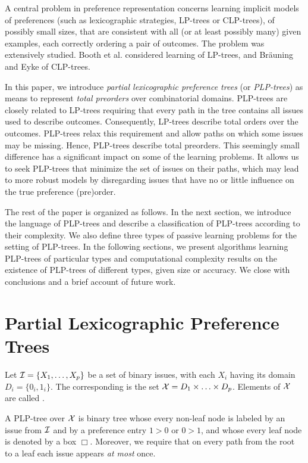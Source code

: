 A central problem in preference representation concerns learning 
implicit models of preferences (such as lexicographic strategies,
LP-trees or CLP-trees), of possibly small sizes, that are consistent 
with all (or at least possibly many) given examples, each correctly 
ordering a pair of outcomes. The problem was extensively studied. Booth
et al.  considered learning of LP-trees, and 
Br\"auning and Eyke  of CLP-trees. 

In this paper, we introduce \emph{partial lexicographic preference trees} (or 
\emph{PLP-trees}) as means to represent \emph{total preorders} over 
combinatorial domains. PLP-trees are closely related to LP-trees
requiring that every path in the tree contains all issues 
used to describe outcomes. Consequently, LP-trees describe total 
orders over the outcomes. PLP-trees relax this requirement and allow 
paths on which some issues may be missing. Hence, 
PLP-trees describe total preorders. This seemingly small difference
has a significant impact on some of the learning problems. It allows
us to seek PLP-trees that minimize the set of issues on their paths,
which may lead to more robust models by disregarding issues 
that have no or little influence on the true preference (pre)order.

The rest of the paper is organized as follows. In the next section, 
we introduce the language of PLP-trees and describe a classification 
of PLP-trees according to their complexity. We also define three types of passive 
learning problems for the setting of PLP-trees. In the following 
sections, we present algorithms learning PLP-trees of particular
types and computational complexity results on the existence of 
PLP-trees of different types, given size or accuracy. We close 
with conclusions and a brief account of future work.


\section{Partial Lexicographic Preference Trees}
Let $\mathcal{I}=\{X_1,\ldots,X_p\}$ be a set of binary issues, with each
$X_i$ having its domain $D_i=\{0_i, 1_i\}$. The corresponding 
 is the set $\mathcal{X}=D_1 \times \ldots \times D_p$.
Elements of  $\mathcal{X}$ are called .

A PLP-tree over $\mathcal{X}$ is binary tree whose every
non-leaf node is labeled by an issue from $\mathcal{I}$ and by a preference
entry $1>0$ or $0>1$, and whose every leaf node is denoted by a box 
$\Box$. Moreover, we require that on every path from the root to a leaf
each issue appears \emph{at most} once. 

